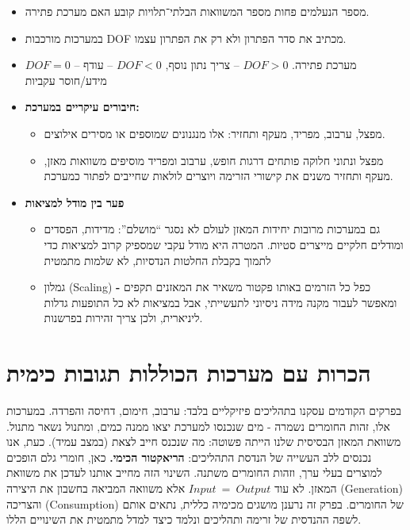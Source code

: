\documentclass[
  hebrew,
  letterpaper,
  DIV=11,
  numbers=noendperiod]{scrreprt}
\begin{document}
\begin{itemize}
\item
  מספר הנעלמים פחות מספר המשוואות הבלתי־תלויות קובע האם מערכת פתירה.
\item
  במערכות מורכבות DOF מכתיב את סדר הפתרון ולא רק את הפתרון עצמו.
\item
  \(DOF = 0\) -- מערכת פתירה. \(DOF > 0\) -- צריך נתון נוסף, \(DOF < 0\)
  -- עודף מידע/חוסר עקביות
\end{itemize}

\begin{itemize}
\item
  \textbf{חיבורים עיקריים במערכת:}

  \begin{itemize}
  \item
    מפצל, ערבוב, מפריד, מעקף ותחזיר: אלו מנגנונים שמוספים או מסירים
    אילוצים.
  \item
    מפצל ונתוני חלוקה פותחים דרגות חופש, ערבוב ומפריד מוסיפים משוואות
    מאזן, מעקף ותחזיר משנים את קישורי הזרימה ויוצרים לולאות שחייבים
    לפתור כמערכת.
  \end{itemize}
\item
  \textbf{פער בין מודל למציאות}

  \begin{itemize}
  \item
    גם במערכות מרובות יחידות המאזן לעולם לא נסגר ``מושלם'': מדידות,
    הפסדים ומודלים חלקיים מייצרים סטיות. המטרה היא מודל עקבי שמספיק קרוב
    למציאות כדי לתמוך בקבלת החלטות הנדסיות, לא שלמות מתמטית
  \item
    גמלון (Scaling) \textbf{-} כפל כל הזרמים באותו פקטור משאיר את
    המאזנים תקפים ומאפשר לעבור מקנה מידה ניסיוני לתעשייתי, אבל במציאות
    לא כל התופעות גדלות ליניארית, ולכן צריך זהירות בפרשנות.
  \end{itemize}
\end{itemize}

\section{הכרות עם מערכות הכוללות תגובות
כימית}\label{ux5d4ux5dbux5e8ux5d5ux5ea-ux5e2ux5dd-ux5deux5e2ux5e8ux5dbux5d5ux5ea-ux5d4ux5dbux5d5ux5dcux5dcux5d5ux5ea-ux5eaux5d2ux5d5ux5d1ux5d5ux5ea-ux5dbux5d9ux5deux5d9ux5ea}

בפרקים הקודמים עסקנו בתהליכים פיזיקליים בלבד: ערבוב, חימום, דחיסה
והפרדה. במערכות אלו, זהות החומרים נשמרה - מים שנכנסו למערכת יצאו ממנה
כמים, ומתנול נשאר מתנול. משוואת המאזן הבסיסית שלנו הייתה פשוטה: מה שנכנס
חייב לצאת (במצב עמיד). כעת, אנו נכנסים ללב העשייה של הנדסת התהליכים:
\textbf{הריאקטור הכימי.} כאן, חומרי גלם הופכים למוצרים בעלי ערך, וזהות
החומרים משתנה. השינוי הזה מחייב אותנו לעדכן את משוואת המאזן. לא עוד
\(Input\  = \ Output\) אלא משוואה המביאה בחשבון את היצירה (Generation)
והצריכה (Consumption) של החומרים. בפרק זה נרענן מושגים מכימיה כללית,
נתאים אותם לשפה ההנדסית של זרימה ותהליכים ונלמד כיצד למדל מתמטית את
השינויים הללו.
\end{document}
